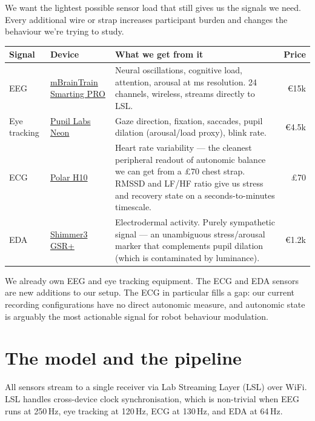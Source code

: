 \documentclass[11pt,a4paper]{article}
\begin{document}
We want the lightest possible sensor load that still gives us the signals we need. Every additional wire or strap increases participant burden and changes the behaviour we're trying to study.

\begin{table}[H]
\centering\small
\begin{tabularx}{\textwidth}{llXr}
\toprule
\textbf{Signal} & \textbf{Device} & \textbf{What we get from it} & \textbf{Price} \\
\midrule
EEG & \href{https://mbraintrain.com/smarting-pro/}{mBrainTrain Smarting PRO} & Neural oscillations, cognitive load, attention, arousal at ms resolution. 24 channels, wireless, streams directly to LSL. & \euro 15k \\
Eye tracking & \href{https://pupil-labs.com/products/neon}{Pupil Labs Neon} & Gaze direction, fixation, saccades, pupil dilation (arousal/load proxy), blink rate. & \euro 4.5k \\
ECG & \href{https://www.polar.com/uk-en/sensors/h10-heart-rate-sensor}{Polar H10} & Heart rate variability --- the cleanest peripheral readout of autonomic balance we can get from a \pounds 70 chest strap. RMSSD and LF/HF ratio give us stress and recovery state on a seconds-to-minutes timescale. & \pounds 70 \\
EDA & \href{https://shimmersensing.com/product/shimmer3-gsr-unit/}{Shimmer3 GSR+} & Electrodermal activity. Purely sympathetic signal --- an unambiguous stress/arousal marker that complements pupil dilation (which is contaminated by luminance). & \euro 1.2k \\
\bottomrule
\end{tabularx}
\end{table}

We already own EEG and eye tracking equipment. The ECG and EDA sensors are new additions to our setup. The ECG in particular fills a gap: our current recording configurations have no direct autonomic measure, and autonomic state is arguably the most actionable signal for robot behaviour modulation.

\section{The model and the pipeline}

All sensors stream to a single receiver via Lab Streaming Layer (LSL) over WiFi. LSL handles cross-device clock synchronisation, which is non-trivial when EEG runs at 250\,Hz, eye tracking at 120\,Hz, ECG at 130\,Hz, and EDA at 64\,Hz.
\end{document}
